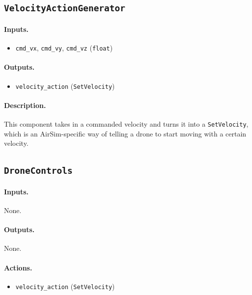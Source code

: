\documentclass{article}
\begin{document}
\subsection{\texttt{VelocityActionGenerator}}

\paragraph{Inputs.}
\begin{itemize}
    \item \verb|cmd_vx|, \verb|cmd_vy|, \verb|cmd_vz| (\verb|float|)
\end{itemize}

\paragraph{Outputs.}
\begin{itemize}
    \item \verb|velocity_action| (\verb|SetVelocity|)
\end{itemize}

\paragraph{Description.} This component takes in a commanded velocity and turns it into a \texttt{SetVelocity}, which is an AirSim-specific way of telling a drone to start moving with a certain velocity. 

\subsection{\texttt{DroneControls}}

\paragraph{Inputs.} None.

\paragraph{Outputs.} None.

\paragraph{Actions.}
\begin{itemize}
    \item \verb|velocity_action| (\verb|SetVelocity|)
\end{itemize}
\end{document}
